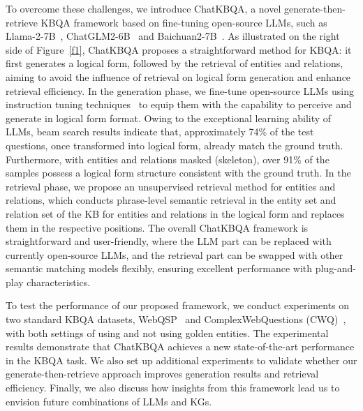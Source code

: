 \documentclass{article} \usepackage{iclr2024_conference,times}
\begin{document}
To overcome these challenges, we introduce ChatKBQA, a novel generate-then-retrieve KBQA framework based on fine-tuning open-source LLMs, such as Llama-2-7B~\citep{Llama2}, ChatGLM2-6B~\citep{GLM} and Baichuan2-7B~\citep{Baichuan2}. As illustrated on the right side of Figure~\ref{f1}, ChatKBQA proposes a straightforward method for KBQA: it first generates a logical form, followed by the retrieval of entities and relations, aiming to avoid the influence of retrieval on logical form generation and enhance retrieval efficiency. In the generation phase, we fine-tune open-source LLMs using instruction tuning techniques~\citep{InstructGPT} to equip them with the capability to perceive and generate in logical form format. Owing to the exceptional learning ability of LLMs, beam search results indicate that, approximately 74\% of the test questions, once transformed into logical form, already match the ground truth. Furthermore, with entities and relations masked (skeleton), over 91\% of the samples possess a logical form structure consistent with the ground truth. In the retrieval phase, we propose an unsupervised retrieval method for entities and relations, which conducts phrase-level semantic retrieval in the entity set and relation set of the KB for entities and relations in the logical form and replaces them in the respective positions. The overall ChatKBQA framework is straightforward and user-friendly, where the LLM part can be replaced with currently open-source LLMs, and the retrieval part can be swapped with other semantic matching models flexibly, ensuring excellent performance with plug-and-play characteristics.

To test the performance of our proposed framework, we conduct experiments on two standard KBQA datasets, WebQSP~\citep{WebQSP} and ComplexWebQuestions (CWQ)~\citep{CWQ}, with both settings of using and not using golden entities. The experimental results demonstrate that ChatKBQA achieves a new state-of-the-art performance in the KBQA task. We also set up additional experiments to validate whether our generate-then-retrieve approach improves generation results and retrieval efficiency. 
Finally, we also discuss how insights from this framework lead us to envision future combinations of LLMs and KGs.
\end{document}
